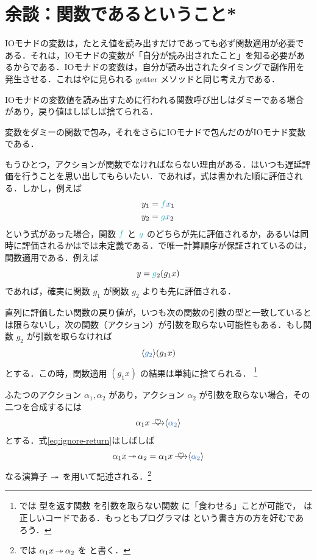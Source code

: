 \documentclass[a5paper,twoside,fleqn,draft]{jsbook}
\begin{document}
\section{余談：関数であるということ*}

IOモナドの変数は，たとえ値を読み出すだけであっても必ず関数適用が必要である．それは，IOモナドの変数が「自分が読み出されたこと」を知る必要があるからである．IOモナドの変数は，自分が読み出されたタイミングで副作用を発生させる．これは\objectivec や\swift に見られる getter メソッドと同じ考え方である．

IOモナドの変数値を読み出すために行われる関数呼び出しはダミーである場合があり，戻り値はしばしば捨てられる．

変数をダミーの関数で包み，それをさらにIOモナドで包んだのがIOモナド変数である．

もうひとつ，アクションが関数でなければならない理由がある．\haskell はいつも遅延評価を行うことを思い出してもらいたい．\python であれば，式は書かれた順に評価される．しかし，例えば
\begin{align}
y_1&=\hFunc{f} \hVar{x}_1\\
y_2&=\hFunc{g} \hVar{x}_2
\end{align}
という式があった場合，関数 $\hFunc{f}$ と $\hFunc{g}$ のどちらが先に評価されるか，あるいは同時に評価されるかは\haskell では未定義である．\haskell で唯一計算順序が保証されているのは，関数適用である．例えば
\begin{equation}
y=\hFunc{g}_2(g_1x)
\end{equation}
であれば，確実に関数 $g_1$ が関数 $g_2$ よりも先に評価される．

直列に評価したい関数の戻り値が，いつも次の関数の引数の型と一致しているとは限らないし，次の関数（アクション）が引数を取らない可能性もある．もし関数 $g_2$ が引数を取らなければ
\begin{equation}
\mConstWith{g_2}(g_1x)
\end{equation}
とする．この時，関数適用 $(g_1x)$ の結果は単純に捨てられる．
\footnote{\clang では  型を返す関数  を引数を取らない関数  に「食わせる」ことが可能で， は正しいコードである．もっとも\clang プログラマは  という書き方の方を好むであろう．}

\separator

ふたつのアクション $\alpha_1,\alpha_2$ があり，アクション $\alpha_2$ が引数を取らない場合，その二つを合成するには
\begin{equation}
\label{eq:ignore-return}
\alpha_1 x\mBindRight\mConstWith{\alpha_2}
\end{equation}
とする．式\eqref{eq:ignore-return}はしばしば
\begin{equation}
\alpha_1 x\mBindRightIgnore\alpha_2=\alpha_1x\mBindRight\mConstWith{\alpha_2}
\end{equation}
なる演算子 $\operatorname{\twoheadrightarrow}$ を用いて記述される．\footnote{\haskell では $\alpha_1x\operatorname{\twoheadrightarrow}\alpha_2$ を  と書く．}
\end{document}
